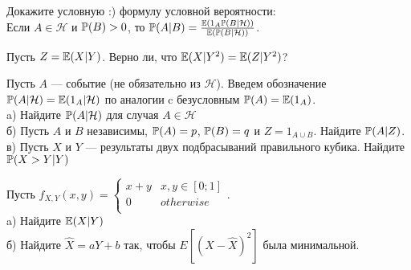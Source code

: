 \begin{solution}
\begin{solution}
\begin{solution}
\begin{solution}
\begin{solution}
\begin{solution}
\begin{solution}
\begin{solution}
\end{solution}

\begin{problem}
Докажите условную :) формулу условной вероятности: \\
Если $A\in \mathcal{H}$ и $\P(B)>0$, то
$\P(A|B)=\frac{\E(1_{A}\P(B|\mathcal{H}))}{\E(\P(B|\mathcal{H}))}$. 
\end{problem} 
\begin{solution} 

\end{solution}

\begin{problem}
Пусть $Z=\E(X|Y)$. Верно ли, что $\E(X|Y^{2})=\E(Z|Y^{2})$? 
\end{problem} 
\begin{solution} 

\end{solution}

\begin{problem}
Пусть $A$ --- событие (не обязательно из $\mathcal{H}$). Введем
обозначение $\P(A|\mathcal{H})=\E(1_A|\mathcal{H})$ по аналогии
c безусловным $\P(A)=\E(1_{A})$. \\
a) Найдите $\P(A|\mathcal{H})$ для случая $A\in\mathcal{H}$ \\
б) Пусть $A$ и $B$ независимы, $\P(A)=p$, $\P(B)=q$ и $Z=1_{A\cup B}$. Найдите $\P(A|Z)$. \\
в) Пусть $X$ и $Y$ --- результаты двух подбрасываний правильного
кубика. Найдите $\P(X>Y|Y)$ 
\end{problem} 
\begin{solution} 

\end{solution}

\begin{problem}
Пусть $f_{X,Y}(x,y)=
\begin{cases}
  x+y & x,y \in [0;1] \\
  0 & otherwise \\
\end{cases}$. \\
a) Найдите $\E(X|Y)$ \\
б) Найдите $\hat{X}=aY+b$ так, чтобы $E[(X-\hat{X})^{2}]$ была
минимальной. 
\end{problem} 
\begin{solution} 

\end{solution}


\end{solution}
\end{solution}
\end{solution}
\end{solution}
\end{solution}
\end{solution}
\end{solution}
